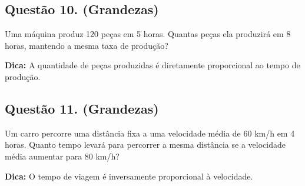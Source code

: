 \documentclass[11pt]{article}
\begin{document}
\begin{multicols}{2}
\subsection*{Questão 10. (Grandezas)}
Uma máquina produz 120 peças em 5 horas. Quantas peças ela produzirá em 8 horas, mantendo a mesma taxa de produção?

\textbf{Dica:} A quantidade de peças produzidas é diretamente proporcional ao tempo de produção.

\subsection*{Questão 11. (Grandezas)}
Um carro percorre uma distância fixa a uma velocidade média de 60 km/h em 4 horas. Quanto tempo levará para percorrer a mesma distância se a velocidade média aumentar para 80 km/h?

\textbf{Dica:} O tempo de viagem é inversamente proporcional à velocidade.

\end{multicols}
\end{document}

